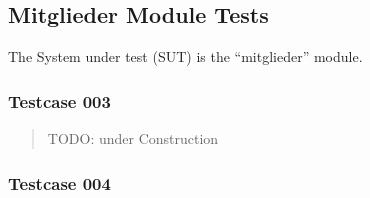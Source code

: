\documentclass[letterpaper,10pt,english]{sphinxmanual}
\begin{document}
\subsection{Mitglieder Module Tests}
\label{\detokenize{masterCodeDoc:mitglieder-module-tests}}
The System under test (SUT) is the “mitglieder” module.


\subsubsection{Testcase 003}
\label{\detokenize{masterCodeDoc:testcase-003}}\begin{quote}

TODO: under Construction
\end{quote}


\subsubsection{Testcase 004}
\end{document}
